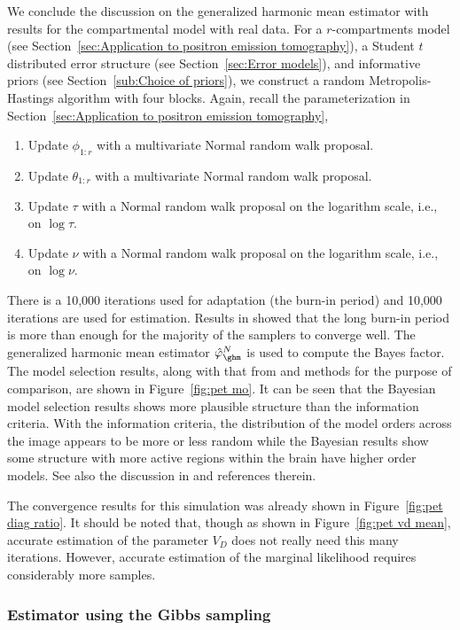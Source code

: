 We conclude the discussion on the generalized harmonic mean estimator with
results for the \pet compartmental model with real data. For a
$r$-compartments \pet model (see Section~\ref{sec:Application to positron
  emission tomography}), a Student $t$ distributed error structure (see
Section~\ref{sec:Error models}), and informative priors (see
Section~\ref{sub:Choice of priors}), we construct a random Metropolis-Hastings
algorithm with four blocks. Again, recall the parameterization in
Section~\ref{sec:Application to positron emission tomography},
\begin{enumerate}
  \item Update $\phi_{1:r}$ with a multivariate Normal random walk proposal.
  \item Update $\theta_{1:r}$ with a multivariate Normal random walk proposal.
  \item Update $\tau$ with a Normal random walk proposal on the logarithm
    scale, i.e., on $\log\tau$.
  \item Update $\nu$ with a Normal random walk proposal on the logarithm
    scale, i.e., on $\log\nu$.
\end{enumerate}
There is a 10,000 iterations used for adaptation (the burn-in period) and
10,000 iterations are used for estimation. Results in \cite{Zhou2013} showed
that the long burn-in period is more than enough for the majority of the
samplers to converge well. The generalized harmonic mean estimator
$\hat\varphi_{\ghm}^N$ is used to compute the Bayes factor. The model
selection results, along with that from \aic and \bic methods for the purpose
of comparison, are shown in Figure~\ref{fig:pet mo}. It can be seen that the
Bayesian model selection results shows more plausible structure than the
information criteria. With the information criteria, the distribution of the
model orders across the image appears to be more or less random while the
Bayesian results show some structure with more active regions within the brain
have higher order models. See also the discussion in \cite{Zhou2013} and
references therein.



The convergence results for this simulation was already shown in
Figure~\ref{fig:pet diag ratio}. It should be noted that, though as shown in
Figure~\ref{fig:pet vd mean}, accurate estimation of the parameter $V_D$ does
not really need this many iterations. However, accurate estimation of the
marginal likelihood requires considerably more samples.

\subsubsection{Estimator using the Gibbs sampling}
\label{ssub:Estimator using the Gibbs sampling}

